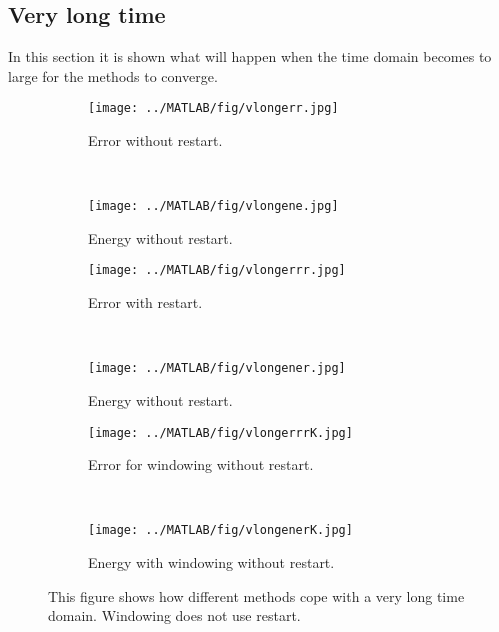 \subsection{Very long time} %
In this section it is shown what will happen when the time domain becomes to large for the methods to converge.
\label{sec:longtime}
\begin{figure}[H]
        \centering
        \begin{subfigure}[b]{0.45\textwidth}
                \texttt{[image: ../MATLAB/fig/vlongerr.jpg]}
                \caption{ Error without restart. }
                \label{fig:vlongerr}
        \end{subfigure}
		~
		\begin{subfigure}[b]{0.45\textwidth}
                \texttt{[image: ../MATLAB/fig/vlongene.jpg]}
                \caption{ Energy without restart. }
                \label{fig:vlongene}
        \end{subfigure}
        
        \begin{subfigure}[b]{0.45\textwidth}
                \texttt{[image: ../MATLAB/fig/vlongerrr.jpg]}
                \caption{ Error with restart. }
                \label{fig:vlongerrr}
        \end{subfigure}
		~
		\begin{subfigure}[b]{0.45\textwidth}
                \texttt{[image: ../MATLAB/fig/vlongener.jpg]}
                \caption{ Energy without restart. }
                \label{fig:vlongener}
        \end{subfigure}
        
        \begin{subfigure}[b]{0.45\textwidth}
                \texttt{[image: ../MATLAB/fig/vlongerrrK.jpg]}
                \caption{ Error for windowing without restart. }
                \label{fig:vlongerrrK}
        \end{subfigure}
		~
		\begin{subfigure}[b]{0.45\textwidth}
                \texttt{[image: ../MATLAB/fig/vlongenerK.jpg]}
                \caption{ Energy with windowing without restart. }
                \label{fig:vlongenerK}
        \end{subfigure}        
        
        \caption{ This figure shows how different methods cope with a very long time domain. Windowing does not use restart.  }
        \label{fig:vlong}
\end{figure}
